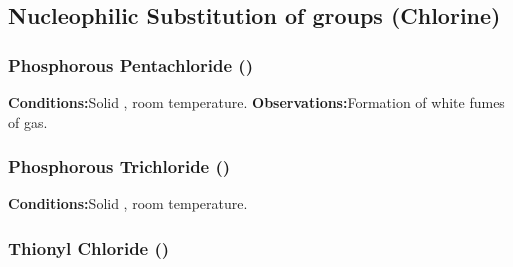 		\subsection{Nucleophilic Substitution of  groups (Chlorine)}

			\subsubsection{Phosphorous Pentachloride ()}

				\vspace{1.5em}
				\vbox{\textbf{Conditions:}\tabto{35mm}Solid , room temperature.}
				\vbox{\textbf{Observations:}\tabto{35mm}Formation of white fumes of  gas.}



			\subsubsection{Phosphorous Trichloride ()}

				\vspace{1.5em}
				\vbox{\textbf{Conditions:}\tabto{35mm}Solid , room temperature.}


			\subsubsection{Thionyl Chloride ()}


